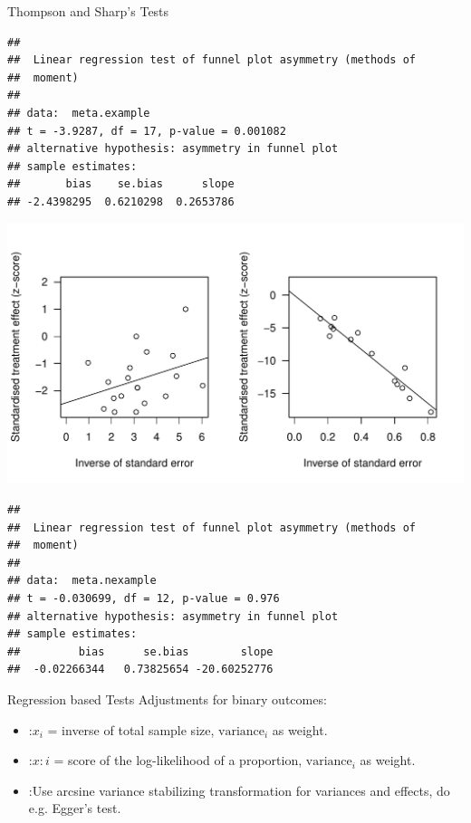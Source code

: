 \documentclass[english]{beamer}\usepackage[]{graphicx}\usepackage[]{color}
\makeatletter
\def\maxwidth{ %
  \ifdim\Gin@nat@width>\linewidth
    \linewidth
  \else
    \Gin@nat@width
  \fi
}
\newenvironment{kframe}{%
 \def\at@end@of@kframe{}%
 \ifinner\ifhmode%
  \def\at@end@of@kframe{\end{minipage}}%
  \begin{minipage}{\columnwidth}%
 \fi\fi%
 \def\FrameCommand##1{\hskip\@totalleftmargin \hskip-\fboxsep
 \colorbox{shadecolor}{##1}\hskip-\fboxsep
     \hskip-\linewidth \hskip-\@totalleftmargin \hskip\columnwidth}%
 \MakeFramed {\advance\hsize-\width
   \@totalleftmargin\z@ \linewidth\hsize
   \@setminipage}}%
 {\par\unskip\endMakeFramed%
 \at@end@of@kframe}
\newenvironment{knitrout}{}{} %
\makeatother
\begin{document}
\begin{frame}[fragile]{Thompson and Sharp's Tests}

\vspace{-6.5cm}

\begin{knitrout}
\color{fgcolor}\begin{kframe}
\begin{verbatim}
## 
## 	Linear regression test of funnel plot asymmetry (methods of
## 	moment)
## 
## data:  meta.example
## t = -3.9287, df = 17, p-value = 0.001082
## alternative hypothesis: asymmetry in funnel plot
## sample estimates:
##       bias    se.bias      slope 
## -2.4398295  0.6210298  0.2653786
\end{verbatim}
\end{kframe}
\includegraphics[width=\maxwidth]{figure/unnamed-chunk-9-1} 
\begin{kframe}\begin{verbatim}
## 
## 	Linear regression test of funnel plot asymmetry (methods of
## 	moment)
## 
## data:  meta.nexample
## t = -0.030699, df = 12, p-value = 0.976
## alternative hypothesis: asymmetry in funnel plot
## sample estimates:
##         bias      se.bias        slope 
##  -0.02266344   0.73825654 -20.60252776
\end{verbatim}
\end{kframe}
\end{knitrout}

\end{frame}



\begin{frame}{Regression based Tests}
Adjustments for binary outcomes:
\begin{itemize}
\item \citet{Peters} :$x_{i}$ = inverse of total sample size, $\textrm{variance}_{i}$ as weight.
\item \citet{Harbord} :$x:{i}$ = score of the log-likelihood of a proportion, $\textrm{variance}_{i}$ as weight.
\item \citet{Rucker} :Use arcsine variance stabilizing transformation for variances and effects, do e.g. Egger's test.
\end{itemize}
\end{frame}
\end{document}
